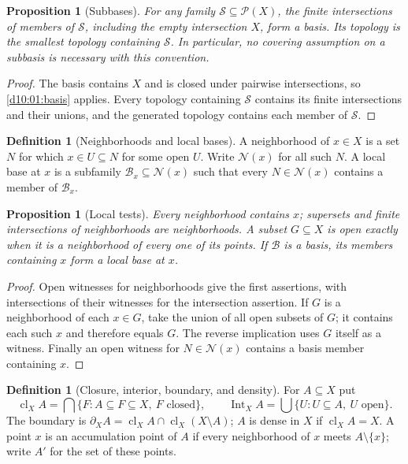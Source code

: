 \documentclass[11pt,oneside,openany]{book}
\newtheorem{proposition}[theorem]{Proposition}
\theoremstyle{definition}
\newtheorem{definition}[theorem]{Definition}
\theoremstyle{remark}
\newcommand{\powset}{\mathcal P}
\newcommand{\BB}{\mathcal B}\newcommand{\FF}{\mathcal F}
\DeclareMathOperator{\cl}{cl}
\DeclareMathOperator{\Int}{Int}
\begin{document}
\begin{proposition}[Subbases]\label{d10:01:subbasis}
For any family $\mathcal S\subseteq\powset(X)$, the finite intersections of members of $\mathcal S$, including the empty intersection $X$, form a basis. Its topology is the smallest topology containing $\mathcal S$. In particular, no covering assumption on a subbasis is necessary with this convention.
\end{proposition}
\begin{proof}
The basis contains $X$ and is closed under pairwise intersections, so \cref{d10:01:basis} applies. Every topology containing $\mathcal S$ contains its finite intersections and their unions, and the generated topology contains each member of $\mathcal S$.
\end{proof}

\begin{definition}[Neighborhoods and local bases]\label{d10:01:neighborhood}
A neighborhood of $x\in X$ is a set $N$ for which $x\in U\subseteq N$ for some open $U$. Write $\mathcal N(x)$ for all such $N$. A local base at $x$ is a subfamily $\mathcal B_x\subseteq\mathcal N(x)$ such that every $N\in\mathcal N(x)$ contains a member of $\mathcal B_x$.
\end{definition}

\begin{proposition}[Local tests]\label{d10:01:local-tests}
Every neighborhood contains $x$; supersets and finite intersections of neighborhoods are neighborhoods. A subset $G\subseteq X$ is open exactly when it is a neighborhood of every one of its points. If $\BB$ is a basis, its members containing $x$ form a local base at $x$.
\end{proposition}
\begin{proof}
Open witnesses for neighborhoods give the first assertions, with intersections of their witnesses for the intersection assertion. If $G$ is a neighborhood of each $x\in G$, take the union of all open subsets of $G$; it contains each such $x$ and therefore equals $G$. The reverse implication uses $G$ itself as a witness. Finally an open witness for $N\in\mathcal N(x)$ contains a basis member containing $x$.
\end{proof}

\begin{definition}[Closure, interior, boundary, and density]\label{d10:01:closure-def}
For $A\subseteq X$ put
\[
 \cl_X A=\bigcap\{F:A\subseteq F\subseteq X,\ F\text{ closed}\},\qquad
 \Int_X A=\bigcup\{U:U\subseteq A,\ U\text{ open}\}.
\]
The boundary is $\partial_X A=\cl_X A\cap\cl_X(X\setminus A)$; $A$ is dense in $X$ if $\cl_X A=X$. A point $x$ is an accumulation point of $A$ if every neighborhood of $x$ meets $A\setminus\{x\}$; write $A'$ for the set of these points.
\end{definition}
\end{document}
